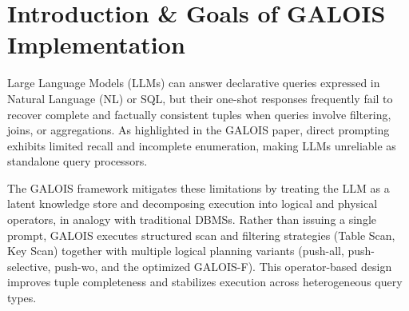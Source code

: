 \section{Introduction \& Goals of GALOIS Implementation}

Large Language Models (LLMs) can answer declarative queries expressed in Natural
Language (NL) or SQL, but their one-shot responses frequently fail to recover complete
and factually consistent tuples when queries involve filtering, joins, or aggregations. As
highlighted in the GALOIS paper, direct prompting exhibits limited recall and incomplete
enumeration, making LLMs unreliable as standalone query processors.

The GALOIS framework mitigates these limitations by treating the LLM as a latent
knowledge store and decomposing execution into logical and physical operators, in
analogy with traditional DBMSs. Rather than issuing a single prompt, GALOIS executes
structured scan and filtering strategies (Table Scan, Key Scan) together with multiple
logical planning variants (push-all, push-selective, push-wo, and the optimized
GALOIS-F). This operator-based design improves tuple completeness and stabilizes
execution across heterogeneous query types.

